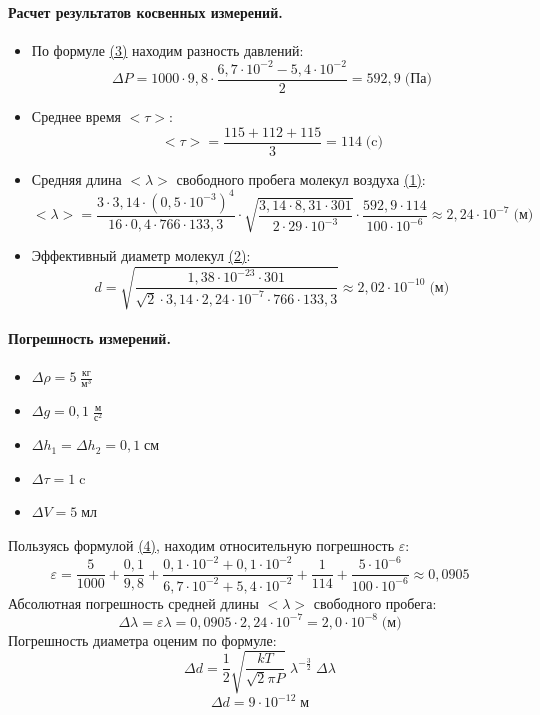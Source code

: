 \documentclass{article}
\begin{document}
	\paragraph{Расчет результатов косвенных измерений.}
	\begin{itemize}
		\item По формуле \hyperlink{formuls}{(3)} находим разность давлений:
		$$ \Delta P=1000\cdot9,8\cdot\frac{6,7\cdot10^{-2}-5,4\cdot10^{-2}}{2}=592,9\;\mbox{(Па)}$$
		\item Среднее время $<\tau>$:
		$$<\tau>=\frac{115+112+115}{3}=114\;\mbox{(c)}$$
		\item Средняя длина $<\lambda>$ свободного пробега молекул воздуха \hyperlink{formuls}{(1)}:
		$$<\lambda>=\frac{3\cdot3,14\cdot(0,5\cdot10^{-3})^4}{16\cdot0,4\cdot766\cdot133,3}\cdot\sqrt{\frac{3,14\cdot8,31\cdot301}{2\cdot29\cdot10^{-3}}}\cdot\frac{592,9\cdot114}{100\cdot10^{-6}}\approx2,24\cdot10^{-7}\;\mbox{(м)}$$
		\item Эффективный диаметр молекул \hyperlink{formuls}{(2)}:
		$$d=\sqrt{\frac{1,38\cdot10^{-23}\cdot301}{\sqrt{2}\cdot3,14\cdot2,24\cdot10^{-7}\cdot766\cdot133,3}}\approx2,02\cdot10^{-10}\;\mbox{(м)}$$
	\end{itemize}
	
	\paragraph{Погрешность измерений.}
	\begin{itemize}
		\item $\Delta\rho=5\;\frac{\mbox{кг}}{\mbox{м}^3}$
		\item$\Delta g=0,1\;\frac{\mbox{м}}{\mbox{с}^2}$
		\item$\Delta h_1=\Delta h_2=0,1\;\mbox{см}$
		\item$\Delta \tau=1\;\mbox{c}$
		\item$\Delta V=5\;\mbox{мл}$
	\end{itemize}
	Пользуясь формулой \hyperlink{formuls}{(4)}, находим относительную погрешность $\varepsilon$:
	$$\varepsilon=\frac{5}{1000}+\frac{0,1}{9,8}+\frac{0,1\cdot10^{-2}+0,1\cdot10^{-2}}{6,7\cdot10^{-2}+5,4\cdot10^{-2}}+\frac{1}{114}+\frac{5\cdot10^{-6}}{100\cdot10^{-6}}\approx0,0905$$
	Абсолютная погрешность средней длины $<\lambda>$  свободного пробега:
	$$\Delta \lambda=\varepsilon\lambda=0,0905\cdot2,24\cdot10^{-7}=2,0\cdot10^{-8}\;\mbox{(м)}$$
	Погрешность диаметра оценим по формуле:
	$$ \Delta d=\frac{1}{2}\sqrt{\frac{kT}{\sqrt{2}\pi P}}\;\lambda^{-\frac{3}{2}}\;\Delta\lambda$$
	$$ \Delta d=9\cdot10^{-12}\;\mbox{м}$$
\end{document}
